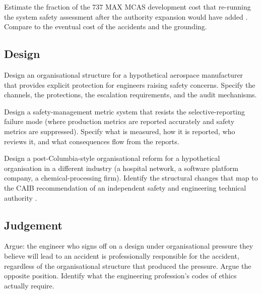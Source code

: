 \begin{exercise}
Estimate the fraction of the 737 MAX MCAS development cost that re-running the system safety assessment after the authority expansion would have added \cite{acc:house-737max-2020}. Compare to the eventual cost of the accidents and the grounding.
\end{exercise}

\subsection*{Design}

\begin{exercise}
Design an organisational structure for a hypothetical aerospace manufacturer that provides explicit protection for engineers raising safety concerns. Specify the channels, the protections, the escalation requirements, and the audit mechanisms.
\end{exercise}

\begin{exercise}
Design a safety-management metric system that resists the selective-reporting failure mode (where production metrics are reported accurately and safety metrics are suppressed). Specify what is measured, how it is reported, who reviews it, and what consequences flow from the reports.
\end{exercise}

\begin{exercise}
Design a post-Columbia-style organisational reform for a hypothetical organisation in a different industry (a hospital network, a software platform company, a chemical-processing firm). Identify the structural changes that map to the CAIB recommendation of an independent safety and engineering technical authority \cite{acc:caib-columbia}.
\end{exercise}

\subsection*{Judgement}

\begin{exercise}
Argue: the engineer who signs off on a design under organisational pressure they believe will lead to an accident is professionally responsible for the accident, regardless of the organisational structure that produced the pressure. Argue the opposite position. Identify what the engineering profession's codes of ethics actually require.
\end{exercise}

